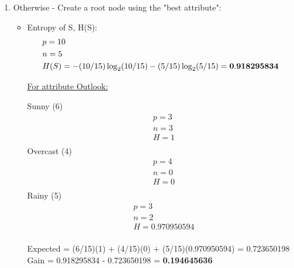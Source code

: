 \documentclass[8pt, fullpage,letterpaper]{article}
\begin{document}
\begin{enumerate}
\begin{enumerate}
\begin{enumerate}
\begin{enumerate}
			\item Otherwise - Create a root node using the "best attribute":
				\begin{itemize}
					\item Entropy of S, H(S):
						\begin{align*}
						    	& p = 10\\
							& n = 5 \\
						    	& H(S) = - (10/15) \log_2 (10/15) - (5/15) \log_2 (5/15) = {\bf 0.918295834}
					      \end{align*}

						\underline {For attribute Outlook:} 
							\vspace{-5pt}
							\begin{multicols}{3}
								Sunny (6)
			 						\begin{align*}
									    	& p = 3\\
										& n = 3 \\
									    	& H = 1\\
								      \end{align*}
								Overcast (4)
			 						\begin{align*}
									    	& p = 4\\
										& n = 0 \\
									    	& H = 0\\
								      \end{align*}
								Rainy (5)
			 						\begin{align*}
									    	& p = 3\\
										& n = 2 \\
									    	& H = 0.970950594\\
								      \end{align*}
							\end{multicols}
							\vspace{-20pt}
							Expected = (6/15)(1) + (4/15)(0) + (5/15)(0.970950594) = 0.723650198\\
							Gain = 0.918295834 - 0.723650198 = {\bf 0.194645636}\\


\end{itemize}
\end{enumerate}
\end{enumerate}
\end{enumerate}
\end{enumerate}
\end{document}
